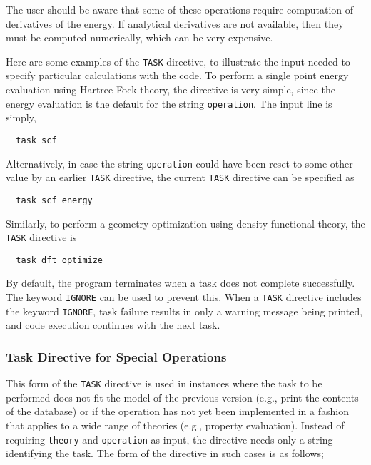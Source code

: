 The user should be aware that some of these operations require
computation of derivatives of the energy.
If analytical derivatives are not available, then they must be
computed numerically, which can be very expensive.

Here are some examples of the \verb+TASK+ directive, to illustrate
the input needed to specify particular calculations with the code.  
To perform a single point energy evaluation using Hartree-Fock theory,
the directive is very simple, since the energy evaluation is the default
for the string \verb+operation+.  The input line is simply,

\begin{verbatim}
  task scf
\end{verbatim}

Alternatively, in case the string \verb+operation+ could have
been reset to some other value by an earlier \verb+TASK+ directive, the
current \verb+TASK+ directive can be specified as

\begin{verbatim}
  task scf energy
\end{verbatim}

Similarly, to perform a geometry optimization using density functional
theory, the \verb+TASK+ directive is

\begin{verbatim}
  task dft optimize
\end{verbatim}


By default, the program terminates when a task does not complete 
successfully.  The keyword \verb+IGNORE+ can be used to prevent this.
When a \verb+TASK+ directive includes the keyword \verb+IGNORE+, 
task failure results in only a warning message being printed, and 
code execution continues with the next task.

\subsubsection{Task Directive for Special Operations}

This form of the \verb+TASK+ directive is used in instances where 
the task to be performed does not fit the model of the previous 
version (e.g., print the contents of the
database) or if the operation has not yet been implemented in a
fashion that applies to a wide range of theories (e.g., property
evaluation).  Instead of requiring \verb+theory+ and \verb+operation+
as input, the directive needs only a string identifying the task.  The form of the
directive in such cases is as follows;

